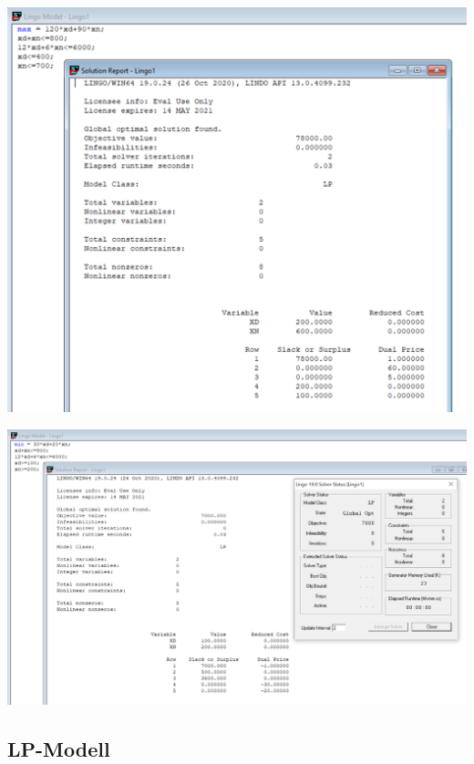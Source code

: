 \documentclass[a4paper,11pt]{article}
\begin{document}
\begin{minipage}{1\textwidth}
  \centering
  \begin{minipage}{.5\textwidth}
    \centering
    \includegraphics[width=1\linewidth]{src/blatt_7_aufgabe_2_solverloesung_1.png}
  \end{minipage}%
  \begin{minipage}{.5\textwidth}
    \centering
    \includegraphics[width=1\linewidth]{src/blatt_7_aufgabe_2_solverloesung_2.png}
  \end{minipage}
\end{minipage}


\subsection*{LP-Modell}
\end{document}
